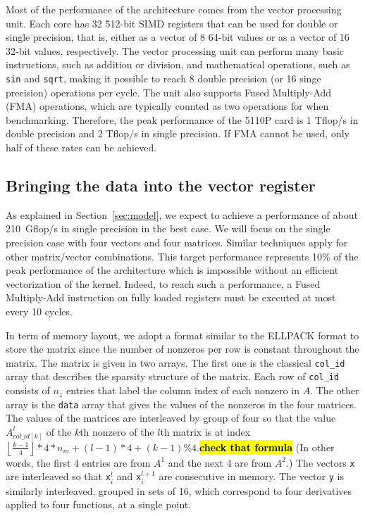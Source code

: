 \documentclass[10pt,conference,compsocconf]{IEEEtran}
\newcommand{\todo}[1]{{\color{red}\textbf{\hl{#1}}\xspace}}
\newcommand{\floor}[1]{\left\lfloor#1\right\rfloor}
\begin{document}
Most of the performance of the architecture comes from the vector
processing unit. Each core has 32 512-bit SIMD registers that can be
used for double or single precision, that is, either as a vector of 8
64-bit values or as a vector of 16 32-bit values, respectively. The
vector processing unit can perform many basic instructions, such as
addition or division, and mathematical operations, such as {\tt sin} and
{\tt sqrt}, making it possible to reach 8 double precision (or 16 singe precision)
operations per cycle.  
The unit also supports Fused Multiply-Add (FMA)
operations, which are typically counted as two operations for
when benchmarking. Therefore, the peak performance of the 5110P
card is 1 Tflop/s in double precision and 2 Tflop/s in single
precision. If FMA cannot be used, only half of these rates can be
achieved.


\subsection{Bringing the data into the vector register}

As explained in Section~\ref{sec:model}, we expect to achieve a performance of
about 210~Gflop/s in single precision in the best case. We will focus
on the single precision case with four vectors and four matrices. 
Similar techniques apply for other matrix/vector combinations. This target
performance represents 10\% of the peak performance of the
architecture which is impossible without an efficient vectorization of
the kernel. Indeed, to reach such a performance, a Fused Multiply-Add
instruction on fully loaded registers must be executed at most every
10 cycles.

In term of memory layout, we adopt a format similar to the ELLPACK
format to store the matrix since the number of nonzeros per row is
constant throughout the matrix. The matrix is given in two arrays. The
first one is the classical {\tt col\_id} array that describes the
sparsity structure of the matrix. Each row of {\tt col\_id} consists
of $n_z$ entries that label the column index of each nonzero in
$A$. The other array is the {\tt data} array that gives the values of
the nonzeros in the four matrices. The values of the matrices are
interleaved by group of four so that the value $A^l_{col\_id[k]}$ of
the $k$th nonzero of the $l$th matrix is at index $\floor{\frac{k-1}{4}}*4*n_m + (l-1)*4+(k-1)\%4$.\todo{check that formula}
(In other words, the first 4 entries are from $A^{1}$ and the next 4 are from $A^2$.) The vectors {\tt x} are
interleaved so that {\tt x}$^l_i$ and {\tt x}$^{l+1}_i$ are
consecutive in memory. The vector {\tt y} is similarly interleaved,
grouped in sets of 16, which correspond to four derivatives applied to
four functions, at a single point.
\end{document}
